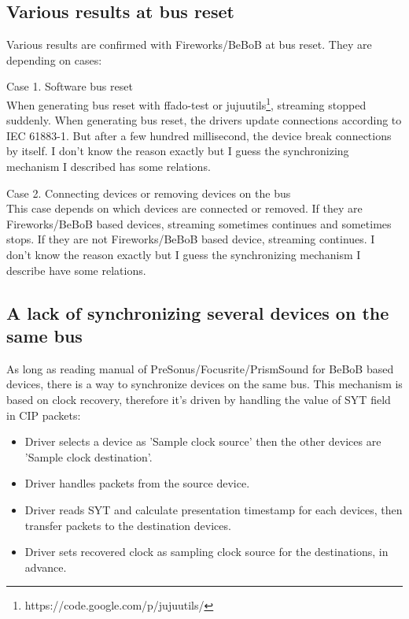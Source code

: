 \documentclass[onecolumn]{article}
\begin{document}
\subsection{Various results at bus reset}
Various results are confirmed with Fireworks/BeBoB at bus reset. They are depending on cases:
\begin{description}
\item{Case 1. Software bus reset} \mbox{} \\
When generating bus reset with ffado-test or jujuutils\footnote{https://code.google.com/p/jujuutils/}, streaming stopped suddenly. When generating bus reset, the drivers update connections according to IEC 61883-1. But after a few hundred millisecond, the device break connections by itself. I don't know the reason exactly but I guess the synchronizing mechanism I described has some relations.
\item{Case 2. Connecting devices or removing devices on the bus} \mbox{} \\
This case depends on which devices are connected or removed. If they are Fireworks/BeBoB based devices, streaming sometimes continues and sometimes stops. If they are not Fireworks/BeBoB based device, streaming continues. I don't know the reason exactly but I guess the synchronizing mechanism I describe have some relations. 
\end{description}

\subsection{A lack of synchronizing several devices on the same bus}
As long as reading manual of PreSonus/Focusrite/PrismSound for BeBoB based devices, there is a way to synchronize devices on the same bus. This mechanism is based on clock recovery, therefore it's driven by handling the value of SYT field in CIP packets:
\begin{itemize}
\item Driver selects a device as 'Sample clock source' then the other devices are 'Sample clock destination'.
\item Driver handles packets from the source device.
\item Driver reads SYT and calculate presentation timestamp for each devices, then transfer packets to the destination devices.
\item Driver sets recovered clock as sampling clock source for the destinations, in advance.
\end{itemize}
\end{document}

